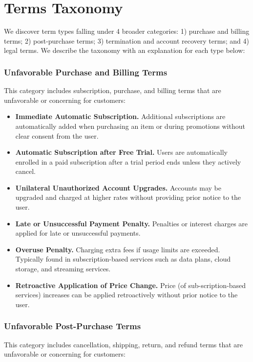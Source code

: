 \section{\TermName Terms Taxonomy}
\label{sec:detailed_tax}


We discover \termname term types falling under 4 broader categories: 1) purchase and billing terms; 2) post-purchase terms; 3) termination and account recovery terms; and 4) legal terms. We describe the taxonomy with an explanation for each type below:

\subsubsection{Unfavorable Purchase and Billing Terms}

This category includes subscription, purchase, and billing terms that are unfavorable or concerning for customers:

\begin{itemize}
    \item \textbf{Immediate Automatic Subscription.} 
    Additional subscriptions are automatically added when purchasing an item or during promotions without clear consent from the user.
    \item \textbf{Automatic Subscription after Free Trial.} Users are automatically enrolled in a paid subscription after a trial period ends unless they actively cancel.
    \item \textbf{Unilateral Unauthorized Account Upgrades.} Accounts may be upgraded and charged at higher rates without providing prior notice to the user.
    \item \textbf{Late or Unsuccessful Payment Penalty.} Penalties or interest charges are applied for late or unsuccessful payments.
    \item \textbf{Overuse Penalty.} Charging extra fees if usage limits are exceeded. Typically found in subscription-based services such as data plans, cloud storage, and streaming services.
    \item \textbf{Retroactive Application of Price Change.} 
    Price (of sub-scription-based services) increases can be applied retroactively without prior notice to the user.
\end{itemize}


\subsubsection{Unfavorable Post-Purchase Terms }
This category includes cancellation, shipping, return, and refund terms that are unfavorable or concerning for customers:

